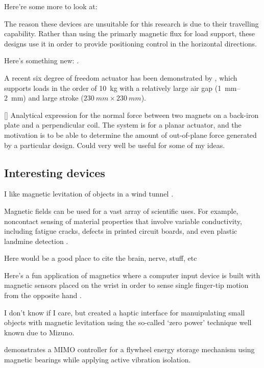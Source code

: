 Here're some more to look at: \textcite{boeij2008,zhang2008a}

The reason these devices are unsuitable for this research is due to their
travelling capability. Rather than using the primarly magnetic flux for load
support, these designs use it in order to provide positioning control in the
horizontal directions.

Here's something new: \textcite{shameli2008}.

A recent six degree of freedom actuator has been demonstrated
by \textcite{jansen2008}, which supports loads in the order of
\SI{10}{kg} with a relatively large air gap (\SI{1}{mm}--\SI{2}{mm}) 
and large stroke ($\SI{230}{mm}\times\SI{230}{mm}$).

[\textcite{dasilveira2005}] Analytical expression for the normal force
between two magnets on a back-iron plate and a perpendicular coil. The system
is for a planar actuator, and the motivation is to be able to determine the
amount of out-of-plane force generated by a particular design. Could very well
be useful for some of my ideas.

\subsection{Interesting devices}

I like magnetic levitation of objects in a wind tunnel
\cite{higuchi2008}.

Magnetic fields can be used for a vast array of scientific uses. For example,
noncontact sensing of material properties that involve variable conductivity,
including fatigue cracks, defects in printed circuit boards, and even plastic
landmine detection \cite{mukhopadhyay2005}.

Here would be a good place to cite the brain, nerve, stuff, etc
\parencite{lu2008,demachi2008}


Here's a fun application of magnetics where a computer input device is built
with magnetic sensors placed on the wrist in order to sense single finger-tip
motion from the opposite hand \parencite{han2008}.

I don't know if I care, but \textcite{vanwest2007} created a
haptic interface for manuipulating small objects with magnetic
levitation using the so-called `zero power' technique well
known due to Mizuno.

\textcite{park2008} demonstrates a MIMO controller for a flywheel energy
storage mechanism using magnetic bearings while applying active vibration
isolation.


